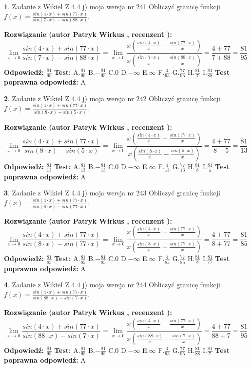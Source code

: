 \documentclass[12pt, a4paper]{article}
\theoremstyle{definition} %
\newtheorem{zad}{}
\newcommand{\zadStart}[1]{\begin{zad}#1\newline}
\newcommand{\zadStop}{\end{zad}}
\newcommand{\rozwStart}[2]{\noindent \textbf{Rozwiązanie (autor #1 , recenzent #2): }\newline}
\newcommand{\rozwStop}{\newline}
\newcommand{\odpStart}{\noindent \textbf{Odpowiedź:}\newline}
\newcommand{\odpStop}{\newline}
\newcommand{\testStart}{\noindent \textbf{Test:}\newline}
\newcommand{\testStop}{\newline}
\newcommand{\kluczStart}{\noindent \textbf{Test poprawna odpowiedź:}\newline}
\newcommand{\kluczStop}{\newline}
\begin{document}
\zadStart{Zadanie z Wikieł Z 4.4 j) moja wersja nr 241}
Obliczyć granicę funkcji $f(x)=\frac{sin(4\cdot x) +sin(77\cdot x)}{sin(7\cdot x) -sin(88\cdot x)}$.
\zadStop
\rozwStart{Patryk Wirkus}{}
$$\lim\limits_{x\to 0}\frac{sin(4\cdot x) +sin(77\cdot x)}{sin(7\cdot x) -sin(88\cdot x)}=\lim\limits_{x\to 0}\frac{x(\frac{sin(4\cdot x)}{x}+\frac{sin(77\cdot x)}{x})}{x(\frac{sin(7\cdot x)}{x}-\frac{sin(88\cdot x)}{x})}=\frac{4+77}{7+88} = \frac{81}{95}$$
\rozwStop
\odpStart
$\frac{81}{95}$
\odpStop
\testStart
A.$\frac{81}{95}$
B.$-\frac{81}{95}$
C.$0$
D.$-\infty$
E.$\infty$
F.$\frac{4}{95}$
G.$\frac{77}{95}$
H.$\frac{81}{7}$
I.$\frac{81}{88}$
\testStop
\kluczStart
A
\kluczStop



\zadStart{Zadanie z Wikieł Z 4.4 j) moja wersja nr 242}
Obliczyć granicę funkcji $f(x)=\frac{sin(4\cdot x) +sin(77\cdot x)}{sin(8\cdot x) -sin(5\cdot x)}$.
\zadStop
\rozwStart{Patryk Wirkus}{}
$$\lim\limits_{x\to 0}\frac{sin(4\cdot x) +sin(77\cdot x)}{sin(8\cdot x) -sin(5\cdot x)}=\lim\limits_{x\to 0}\frac{x(\frac{sin(4\cdot x)}{x}+\frac{sin(77\cdot x)}{x})}{x(\frac{sin(8\cdot x)}{x}-\frac{sin(5\cdot x)}{x})}=\frac{4+77}{8+5} = \frac{81}{13}$$
\rozwStop
\odpStart
$\frac{81}{13}$
\odpStop
\testStart
A.$\frac{81}{13}$
B.$-\frac{81}{13}$
C.$0$
D.$-\infty$
E.$\infty$
F.$\frac{4}{13}$
G.$\frac{77}{13}$
H.$\frac{81}{8}$
I.$\frac{81}{5}$
\testStop
\kluczStart
A
\kluczStop



\zadStart{Zadanie z Wikieł Z 4.4 j) moja wersja nr 243}
Obliczyć granicę funkcji $f(x)=\frac{sin(4\cdot x) +sin(77\cdot x)}{sin(8\cdot x) -sin(77\cdot x)}$.
\zadStop
\rozwStart{Patryk Wirkus}{}
$$\lim\limits_{x\to 0}\frac{sin(4\cdot x) +sin(77\cdot x)}{sin(8\cdot x) -sin(77\cdot x)}=\lim\limits_{x\to 0}\frac{x(\frac{sin(4\cdot x)}{x}+\frac{sin(77\cdot x)}{x})}{x(\frac{sin(8\cdot x)}{x}-\frac{sin(77\cdot x)}{x})}=\frac{4+77}{8+77} = \frac{81}{85}$$
\rozwStop
\odpStart
$\frac{81}{85}$
\odpStop
\testStart
A.$\frac{81}{85}$
B.$-\frac{81}{85}$
C.$0$
D.$-\infty$
E.$\infty$
F.$\frac{4}{85}$
G.$\frac{77}{85}$
H.$\frac{81}{8}$
I.$\frac{81}{77}$
\testStop
\kluczStart
A
\kluczStop



\zadStart{Zadanie z Wikieł Z 4.4 j) moja wersja nr 244}
Obliczyć granicę funkcji $f(x)=\frac{sin(4\cdot x) +sin(77\cdot x)}{sin(88\cdot x) -sin(7\cdot x)}$.
\zadStop
\rozwStart{Patryk Wirkus}{}
$$\lim\limits_{x\to 0}\frac{sin(4\cdot x) +sin(77\cdot x)}{sin(88\cdot x) -sin(7\cdot x)}=\lim\limits_{x\to 0}\frac{x(\frac{sin(4\cdot x)}{x}+\frac{sin(77\cdot x)}{x})}{x(\frac{sin(88\cdot x)}{x}-\frac{sin(7\cdot x)}{x})}=\frac{4+77}{88+7} = \frac{81}{95}$$
\rozwStop
\odpStart
$\frac{81}{95}$
\odpStop
\testStart
A.$\frac{81}{95}$
B.$-\frac{81}{95}$
C.$0$
D.$-\infty$
E.$\infty$
F.$\frac{4}{95}$
G.$\frac{77}{95}$
H.$\frac{81}{88}$
I.$\frac{81}{7}$
\testStop
\kluczStart
A
\kluczStop
\end{document}
